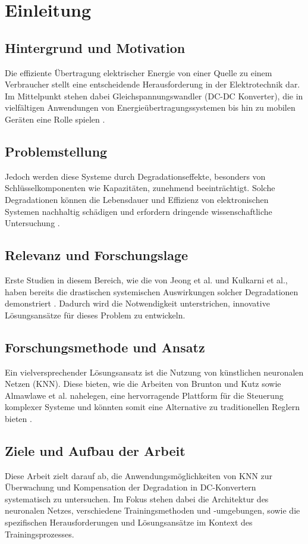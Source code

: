 \chapter{Einleitung}
\section{Hintergrund und Motivation}
Die effiziente Übertragung elektrischer Energie von einer Quelle zu einem Verbraucher stellt eine entscheidende Herausforderung in der Elektrotechnik dar. Im Mittelpunkt stehen dabei Gleichspannungswandler (DC-DC Konverter), die in vielfältigen Anwendungen von Energieübertragungssystemen bis hin zu mobilen Geräten eine Rolle spielen \cite[p.~70]{wensdesign2022}.

\section{Problemstellung}
Jedoch werden diese Systeme durch Degradationseffekte, besonders von Schlüsselkomponenten wie Kapazitäten, zunehmend beeinträchtigt. Solche Degradationen können die Lebensdauer und Effizienz von elektronischen Systemen nachhaltig schädigen und erfordern dringende wissenschaftliche Untersuchung \cite[p.~1]{jeong2023degradation}.

\section{Relevanz und Forschungslage}
Erste Studien in diesem Bereich, wie die von Jeong et al. und Kulkarni et al., haben bereits die drastischen systemischen Auswirkungen solcher Degradationen demonstriert \cite[p.~3]{kulkarni_model-based_2023}. Dadurch wird die Notwendigkeit unterstrichen, innovative Lösungsansätze für dieses Problem zu entwickeln.

\section{Forschungsmethode und Ansatz}
Ein vielversprechender Lösungsansatz ist die Nutzung von künstlichen neuronalen Netzen (KNN). Diese bieten, wie die Arbeiten von Brunton und Kutz sowie Almawlawe et al. nahelegen, eine hervorragende Plattform für die Steuerung komplexer Systeme und könnten somit eine Alternative zu traditionellen Reglern bieten \cite[p.~270]{brunton2019data} \cite[p.~8]{Almawlawe2023}.

\section{Ziele und Aufbau der Arbeit}
Diese Arbeit zielt darauf ab, die Anwendungsmöglichkeiten von KNN zur Überwachung und Kompensation der Degradation in DC-Konvertern systematisch zu untersuchen. Im Fokus stehen dabei die Architektur des neuronalen Netzes, verschiedene Trainingsmethoden und -umgebungen, sowie die spezifischen Herausforderungen und Lösungsansätze im Kontext des Trainingsprozesses.
